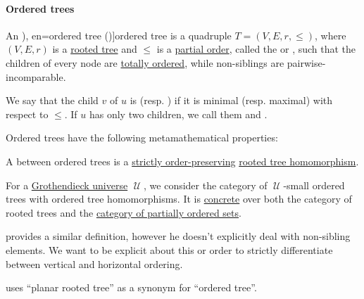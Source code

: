 \paragraph{Ordered trees}

\begin{definition}\label{def:ordered_tree}\mimprovised
  An \term[ru=упорядоченное дерево (\cite[\textnumero 9.3.5]{Новиков2013}), en=ordered tree (\cite[639]{Rosen1999})]{ordered tree} is a quadruple \( T = (V, E, r, \leq) \), where \( (V, E, r) \) is a \hyperref[def:rooted_tree]{rooted tree} and \( {\leq} \) is a \hyperref[def:partially_ordered_set]{partial order}, called the  or , such that the children of every node are \hyperref[def:totally_order_chain]{totally ordered}, while non-siblings are pairwise-incomparable.

  \begin{thmenum}[series=def:ordered_tree]
     We say that the child \( v \) of \( u \) is  (resp. ) if it is minimal (resp. maximal) with respect to \( {\leq} \). If \( u \) has only two children, we call them  and .
  \end{thmenum}

  Ordered trees have the following metamathematical properties:
  \begin{thmenum}
     A  between ordered trees is a \hyperref[def:order_function/preserving]{strictly order-preserving} \hyperref[def:rooted_tree/homomorphism]{rooted tree homomorphism}.

     For a \hyperref[def:grothendieck_universe]{Grothendieck universe} \( \mscrU \), we consider the category of \( \mscrU \)-small ordered trees with ordered tree homomorphisms. It is \hyperref[def:concrete_category]{concrete} over both the category of rooted trees and the \hyperref[def:partially_ordered_set]{category of partially ordered sets}.
  \end{thmenum}
\end{definition}
\begin{comments}
  \item {} provides a similar definition, however he doesn't explicitly deal with non-sibling elements. We want to be explicit about this or order to strictly differentiate between vertical and horizontal ordering.

  \item {} uses \enquote{planar rooted tree} as a synonym for \enquote{ordered tree}.
\end{comments}

